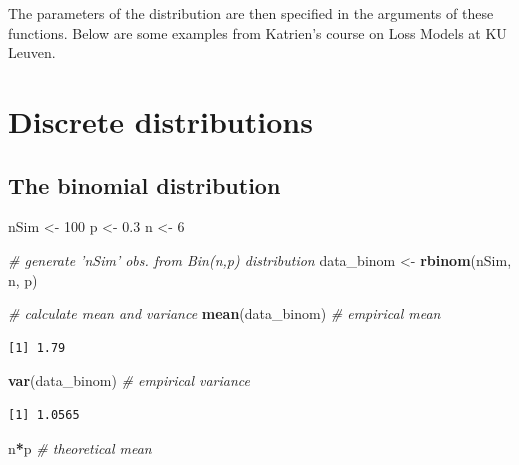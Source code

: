 \documentclass[
]{book}
\newenvironment{Shaded}{\begin{snugshade}}{\end{snugshade}}
\newcommand{\CommentTok}[1]{\textcolor[rgb]{0.56,0.35,0.01}{\textit{#1}}}
\newcommand{\DecValTok}[1]{\textcolor[rgb]{0.00,0.00,0.81}{#1}}
\newcommand{\FloatTok}[1]{\textcolor[rgb]{0.00,0.00,0.81}{#1}}
\newcommand{\KeywordTok}[1]{\textcolor[rgb]{0.13,0.29,0.53}{\textbf{#1}}}
\newcommand{\NormalTok}[1]{#1}
\newcommand{\OperatorTok}[1]{\textcolor[rgb]{0.81,0.36,0.00}{\textbf{#1}}}
\newcommand{\StringTok}[1]{\textcolor[rgb]{0.31,0.60,0.02}{#1}}
\begin{document}
The parameters of the distribution are then specified in the arguments of these functions. Below are some examples from Katrien's course on Loss Models at KU Leuven.

\hypertarget{discrete-distributions}{%
\section{Discrete distributions}\label{discrete-distributions}}

\hypertarget{the-binomial-distribution}{%
\subsection{The binomial distribution}\label{the-binomial-distribution}}

\begin{Shaded}
\begin{Highlighting}[]
\NormalTok{nSim 	   <-}\StringTok{ }\DecValTok{100}
\NormalTok{p        <-}\StringTok{ }\FloatTok{0.3}
\NormalTok{n	       <-}\StringTok{ }\DecValTok{6}

\CommentTok{# generate 'nSim' obs. from Bin(n,p) distribution }
\NormalTok{data_binom <-}\StringTok{ }\KeywordTok{rbinom}\NormalTok{(nSim, n, p)}

\CommentTok{# calculate mean and variance}
\KeywordTok{mean}\NormalTok{(data_binom) }\CommentTok{# empirical mean}
\end{Highlighting}
\end{Shaded}

\begin{verbatim}
[1] 1.79
\end{verbatim}

\begin{Shaded}
\begin{Highlighting}[]
\KeywordTok{var}\NormalTok{(data_binom)  }\CommentTok{# empirical variance}
\end{Highlighting}
\end{Shaded}

\begin{verbatim}
[1] 1.0565
\end{verbatim}

\begin{Shaded}
\begin{Highlighting}[]
\NormalTok{n}\OperatorTok{*}\NormalTok{p 		      }\CommentTok{# theoretical mean}
\end{Highlighting}
\end{Shaded}
\end{document}

